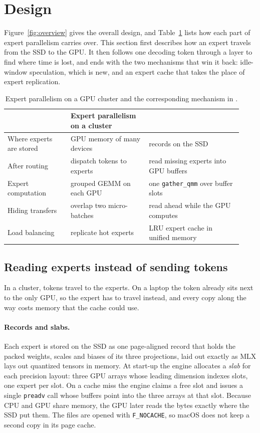 \section{Design}
\label{sec:design}
Figure~\ref{fig:overview} gives the overall design, and Table~\ref{tab:mapping} lists how each part of expert parallelism carries over. This section first describes how an expert travels from the SSD to the GPU. It then follows one decoding token through a layer to find where time is lost, and ends with the two mechanisms that win it back: idle-window speculation, which is new, and an expert cache that takes the place of expert replication.

\begin{table}[t]
\centering
\small
\caption{Expert parallelism on a GPU cluster and the corresponding mechanism in \method{}.}
\label{tab:mapping}
\begin{tabular}{@{}p{0.25\linewidth}p{0.31\linewidth}p{0.37\linewidth}@{}}
\toprule
& Expert parallelism on a cluster & \method{} \\
\midrule
Where experts are stored & GPU memory of many devices & records on the SSD \\
After routing & dispatch tokens to experts & read missing experts into GPU buffers \\
Expert computation & grouped GEMM on each GPU & one \texttt{gather\_qmm} over buffer slots \\
Hiding transfers & overlap two micro-batches & read ahead while the GPU computes \\
Load balancing & replicate hot experts & LRU expert cache in unified memory \\
\bottomrule
\end{tabular}
\end{table}

\subsection{Reading experts instead of sending tokens}
\label{sec:fetch}
In a cluster, tokens travel to the experts. On a laptop the token already sits next to the only GPU, so the expert has to travel instead, and every copy along the way costs memory that the cache could use.

\paragraph{Records and slabs.} Each expert is stored on the SSD as one page-aligned record that holds the packed weights, scales and biases of its three projections, laid out exactly as MLX \citep{mlx} lays out quantized tensors in memory. At start-up the engine allocates a \emph{slab} for each precision layout: three GPU arrays whose leading dimension indexes slots, one expert per slot. On a cache miss the engine claims a free slot and issues a single \texttt{preadv} call whose buffers point into the three arrays at that slot. Because CPU and GPU share memory, the GPU later reads the bytes exactly where the SSD put them. The files are opened with \texttt{F\_NOCACHE}, so macOS does not keep a second copy in its page cache.


